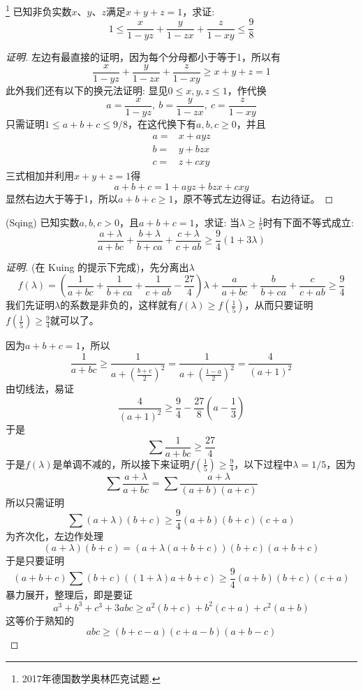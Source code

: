 \begin{exercise}\footnote{2017年德国数学奥林匹克试题.}
  已知非负实数$x$、$y$、$z$满足$x+y+z=1$，求证:
  \[ 1 \leqslant \frac{x}{1-yz}+\frac{y}{1-zx}+\frac{z}{1-xy} \leqslant \frac{9}{8} \]
\end{exercise}

\begin{proof}[证明]
  左边有最直接的证明，因为每个分母都小于等于1，所以有
  \[ \frac{x}{1-yz}+\frac{y}{1-zx}+\frac{z}{1-xy} \geqslant x+y+z = 1 \]
  此外我们还有以下的换元法证明:
  显见$0 \leqslant x,y,z \leqslant 1$，作代换
  \[ a=\frac{x}{1-yz}, \  b=\frac{y}{1-zx}, \  c=\frac{z}{1-xy} \]
  只需证明$1\leqslant a+b+c \leqslant 9/8$，在这代换下有$a,b,c \geqslant 0$，并且
  \begin{align*}
    a = {} & x+ayz \\
    b = {} & y+bzx \\
    c = {} & z+cxy
  \end{align*}
  三式相加并利用$x+y+z=1$得
  \[ a+b+c=1+ayz+bzx+cxy \]
  显然右边大于等于1，所以$a+b+c\geqslant 1$，原不等式左边得证。右边待证。
\end{proof}

\begin{example}
  (Sqing) 已知实数$a,b,c>0$，且$a+b+c=1$，求证: 当$\lambda \geqslant \frac{1}{5}$时有下面不等式成立:
  \[ \frac{a+\lambda}{a+bc} + \frac{b+\lambda}{b+ca} + \frac{c+\lambda}{c+ab} \geqslant \frac{9}{4}(1+3\lambda) \]
  \begin{proof}[证明]
    (在 Kuing 的提示下完成)，先分离出$\lambda$
    \[ f(\lambda) = \left( \frac{1}{a+bc}+\frac{1}{b+ca}+\frac{1}{c+ab}-\frac{27}{4} \right) \lambda + \frac{a}{a+bc}+\frac{b}{b+ca}+\frac{c}{c+ab} \geqslant \frac{9}{4} \]
    我们先证明$\lambda$的系数是非负的，这样就有$f(\lambda)\geqslant f\left( \frac{1}{5} \right)$，从而只要证明$f\left( \frac{1}{5} \right) \geqslant \frac{9}{4}$就可以了。

    因为$a+b+c=1$，所以
    \[ \frac{1}{a+bc} \geqslant \frac{1}{a+\left( \frac{b+c}{2} \right)^2} =
    \frac{1}{a+\left( \frac{1-a}{2} \right)^2} = \frac{4}{(a+1)^2} \]
  由切线法，易证
  \[ \frac{4}{(a+1)^2} \geqslant \frac{9}{4}-\frac{27}{8}\left( a-\frac{1}{3} \right) \]
  于是
  \[ \sum \frac{1}{a+bc} \geqslant \frac{27}{4} \]
  于是$f(\lambda)$是单调不减的，所以接下来证明$f\left( \frac{1}{5} \right) \geqslant \frac{9}{4}$，以下过程中$\lambda=1/5$，因为
  \[ \sum \frac{a+\lambda}{a+bc} = \sum \frac{a+\lambda}{(a+b)(a+c)} \]
  所以只需证明
  \[ \sum (a+\lambda)(b+c) \geqslant \frac{9}{4}(a+b)(b+c)(c+a) \]
  为齐次化，左边作处理
  \[ (a+\lambda)(b+c) = (a+\lambda(a+b+c))(b+c)(a+b+c) \]
  于是只要证明
  \[ (a+b+c)\sum (b+c)((1+\lambda)a+b+c) \geqslant \frac{9}{4}(a+b)(b+c)(c+a) \]
  暴力展开，整理后，即是要证
  \[ a^3+b^3+c^3 +3abc \geqslant a^2(b+c) + b^2(c+a)+c^2(a+b) \]
  这等价于熟知的
  \[ abc \geqslant (b+c-a)(c+a-b)(a+b-c) \]
  \end{proof}
\end{example}

